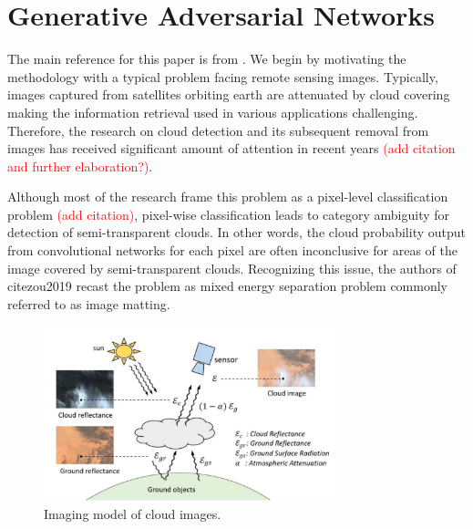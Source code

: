 \section{Generative Adversarial Networks } \label{sec:gan}

The main reference for this paper is from \cite{zou2019}. We begin by motivating the methodology with a typical problem facing remote sensing images. Typically, images captured from satellites orbiting earth are attenuated by cloud covering making the information retrieval used in various applications challenging. Therefore, the research on cloud detection and its subsequent removal from images has received significant amount of attention in recent years \textcolor{red}{(add citation and further elaboration?)}. 

Although most of the research frame this problem as a pixel-level classification problem \textcolor{red}{(add citation)}, pixel-wise classification leads to category ambiguity for detection of semi-transparent clouds. In other words, the cloud probability output from convolutional networks for each pixel are often inconclusive for areas of the image covered by semi-transparent clouds. Recognizing this issue, the authors of cite{zou2019} recast the problem as mixed energy separation problem commonly referred to as image matting. 

\begin{figure}[h]
\centering
\includegraphics[width=0.75\textwidth]{images/cloud_matting_image}
\caption{Imaging model of cloud images.}
\end{figure}